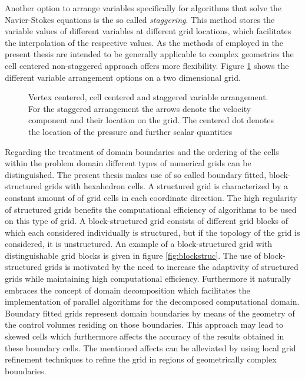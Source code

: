 Another option to arrange variables specifically for algorithms that solve the Navier-Stokes equations is the so called \emph{staggering}. This method stores the variable values of different variables at different grid locations, which facilitates the interpolation of the respective values. As the methods of employed in the present thesis are intended to be generally applicable to complex geometries the cell centered non-staggered approach offers more flexibility.  Figure \ref{fig:cellvertex} shows the different variable arrangement options on a two dimensional grid.

\begin{figure}[h!]
   \label{fig:cellvertex}
    \hfil
    \hfil
    \caption{Vertex centered, cell centered and staggered variable arrangement. For the staggered arrangement the arrows denote the velocity component and their location on the grid. The centered dot denotes the location of the pressure and further scalar quantities}
\end{figure}

Regarding the treatment of domain boundaries and the ordering of the cells within the problem domain different types of numerical grids can be distinguished. The present thesis makes use of so called boundary fitted, block-structured grids with hexahedron cells. A structured grid is characterized by a constant amount of of grid cells in each coordinate direction. The high regularity of structured grids benefits the computational efficiency of algorithms to be used on this type of grid. A block-structured grid consists of different grid blocks of which each considered individually is structured, but if the topology of the grid is considered, it is unstructured. An example of a block-structured grid with distinguishable grid blocks is given in figure \ref{fig:blockstruc}. The use of block-structured grids is motivated by the need to increase the adaptivity of structured grids while maintaining high computational efficiency. Furthermore it naturally embraces the concept of domain decomposition which facilitates the implementation of parallel algorithms for the decomposed computational domain. Boundary fitted grids represent domain boundaries by means of the geometry of the control volumes residing on those boundaries. This approach may lead to skewed cells which furthermore affects the accuracy of the results obtained in these boundary cells. The mentioned affects can be alleviated by using local grid refinement techniques to refine the grid in regions of geometrically complex boundaries.

